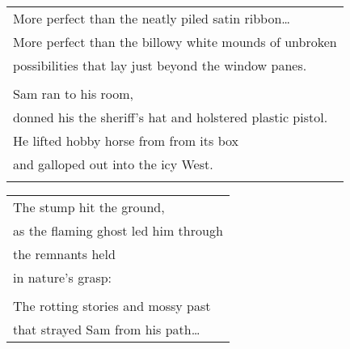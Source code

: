 \documentclass{article}
\begin{document}
\begin{center}
\begin{tabular}{l}
\hspace*{2ex}More perfect than the neatly piled satin ribbon\ldots \\
\hspace*{2ex}More perfect than the billowy white mounds of unbroken \\
\hspace*{2ex}possibilities that lay just beyond the window panes. \\
\\
\hspace*{2ex}Sam ran to his room, \\
\hspace*{2ex}donned his the sheriff's hat and holstered plastic pistol. \\
\hspace*{2ex}He lifted hobby horse from from its box \\
\hspace*{2ex}and galloped out into the icy West. \\
\\
\end{tabular}
\begin{tabular}{l}
The stump hit the ground, \\
as the flaming ghost led him through \\
the remnants held \\
in nature's grasp: \\
\\
The rotting stories and mossy past \\
that strayed Sam from his path\ldots \\


\end{tabular}
\end{center}
\end{document}
